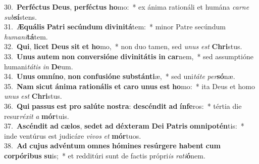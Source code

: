 {30.~}\textbf{Per}\textbf{fé}\textbf{ctus} \textbf{De}\textbf{us}, \textbf{per}\textbf{fé}\textbf{ctus} \textbf{ho}mo:~* ex ánima rationáli et humána \textit{car}\textit{ne} \textit{sub}\textbf{sí}stens.\\
{31.~}\textbf{Æ}\textbf{quá}\textbf{lis} \textbf{Pa}\textbf{tri} \textbf{se}\textbf{cún}\textbf{dum} \textbf{di}\textbf{vi}\textbf{ni}\textbf{tá}tem:~* minor Patre secúndum \textit{hu}\textit{ma}\textit{ni}\textbf{tá}tem.\\
{32.~}\textbf{Qui}, \textbf{li}\textbf{cet} \textbf{De}\textbf{us} \textbf{sit} \textbf{et} \textbf{ho}mo,~* non duo tamen, sed \textit{u}\textit{nus} \textit{est} \textbf{Chri}stus.\\
{33.~}\textbf{U}\textbf{nus} \textbf{au}\textbf{tem} \textbf{non} \textbf{con}\textbf{ver}\textbf{si}\textbf{ó}\textbf{ne} \textbf{di}\textbf{vi}\textbf{ni}\textbf{tá}\textbf{tis} \textbf{in} \textbf{car}nem,~* sed assumptióne humani\textit{tá}\textit{tis} \textit{in} \textbf{De}um.\\
{34.~}\textbf{U}\textbf{nus} \textbf{om}\textbf{ní}\textbf{no}, \textbf{non} \textbf{con}\textbf{fu}\textbf{si}\textbf{ó}\textbf{ne} \textbf{sub}\textbf{stán}\textbf{ti}æ,~* sed uni\textit{tá}\textit{te} \textit{per}\textbf{só}næ.\\
{35.~}\textbf{Nam} \textbf{si}\textbf{cut} \textbf{á}\textbf{ni}\textbf{ma} \textbf{ra}\textbf{ti}\textbf{o}\textbf{ná}\textbf{lis} \textbf{et} \textbf{ca}\textbf{ro} \textbf{u}\textbf{nus} \textbf{est} \textbf{ho}mo:~* ita Deus et homo \textit{u}\textit{nus} \textit{est} \textbf{Chri}stus.\\
{36.~}\textbf{Qui} \textbf{pas}\textbf{sus} \textbf{est} \textbf{pro} \textbf{sa}\textbf{lú}\textbf{te} \textbf{no}\textbf{stra}: \textbf{de}\textbf{scén}\textbf{dit} \textbf{ad} \textbf{ín}\textbf{fe}ros:~* tértia die resur\textit{ré}\textit{xit} \textit{a} \textbf{mór}tuis.\\
{37.~}\textbf{A}\textbf{scén}\textbf{dit} \textbf{ad} \textbf{cæ}\textbf{los}, \textbf{se}\textbf{det} \textbf{ad} \textbf{déx}\textbf{te}\textbf{ram} \textbf{De}\textbf{i} \textbf{Pa}\textbf{tris} \textbf{om}\textbf{ni}\textbf{po}\textbf{tén}tis:~* inde ventúrus est judicáre \textit{vi}\textit{vos} \textit{et} \textbf{mór}tuos.\\
{38.~}\textbf{Ad} \textbf{cu}\textbf{jus} \textbf{ad}\textbf{vén}\textbf{tum} \textbf{om}\textbf{nes} \textbf{hó}\textbf{mi}\textbf{nes} \textbf{re}\textbf{súr}\textbf{ge}\textbf{re} \textbf{ha}\textbf{bent} \textbf{cum} \textbf{cor}\textbf{pó}\textbf{ri}\textbf{bus} \textbf{su}is;~* et redditúri sunt de factis própri\textit{is} \textit{ra}\textit{ti}\textbf{ó}nem.\\
